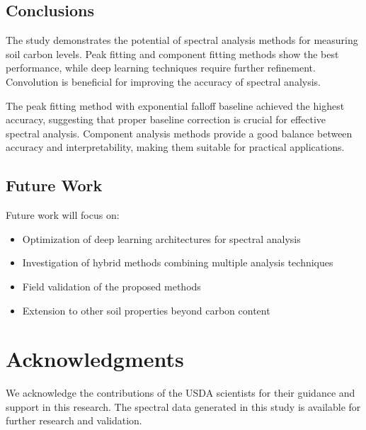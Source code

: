 \documentclass[review]{elsarticle}
\begin{document}
\subsection{Conclusions}

The study demonstrates the potential of spectral analysis methods for measuring soil carbon levels. Peak fitting and component fitting methods show the best performance, while deep learning techniques require further refinement. Convolution is beneficial for improving the accuracy of spectral analysis.

The peak fitting method with exponential falloff baseline achieved the highest accuracy, suggesting that proper baseline correction is crucial for effective spectral analysis. Component analysis methods provide a good balance between accuracy and interpretability, making them suitable for practical applications.

\subsection{Future Work}

Future work will focus on:
\begin{itemize}
\item Optimization of deep learning architectures for spectral analysis
\item Investigation of hybrid methods combining multiple analysis techniques
\item Field validation of the proposed methods
\item Extension to other soil properties beyond carbon content
\end{itemize}

\section{Acknowledgments}

We acknowledge the contributions of the USDA scientists for their guidance and support in this research. The spectral data generated in this study is available for further research and validation.



\end{document}
